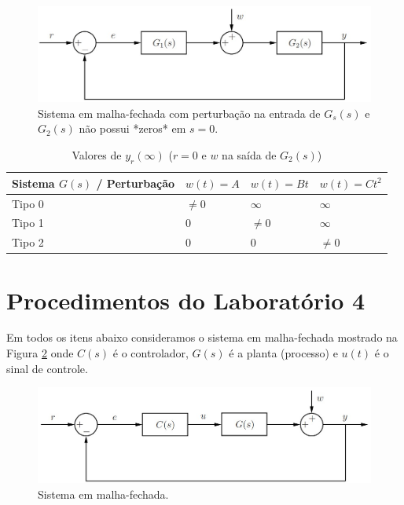 \documentclass[
]{book}
\begin{document}
\begin{figure}
\includegraphics[width=0.8\linewidth]{Imagens/Lab4/Apresentação/fig2} \caption{Sistema em malha-fechada com perturbação na entrada de $G_s(s)$ e $G_2(s)$ não possui *zeros* em $s=0$.}\label{fig:fig42}
\end{figure}

\begin{table}

\caption{\label{tab:tab43}Valores de $y_r(\infty)$ ($r=0$ e $w$ na saída de $G_2(s)$)}
\centering
\begin{tabular}[t]{llll}
\toprule
Sistema $G(s)$ / Perturbação & $w(t)=A$ & $w(t) = Bt$ & $w(t) = Ct^2$\\
\midrule
Tipo 0 & $\neq 0$ & $\infty$ & $\infty$\\
Tipo 1 & 0 & $\neq 0$ & $\infty$\\
Tipo 2 & 0 & 0 & $\neq 0$\\
\bottomrule
\end{tabular}
\end{table}

\hypertarget{procedimentos-do-laboratuxf3rio-4}{%
\section*{Procedimentos do Laboratório 4}\label{procedimentos-do-laboratuxf3rio-4}}

Em todos os itens abaixo consideramos o sistema em malha-fechada mostrado na Figura \ref{fig:fig43} onde \(C(s)\) é o controlador, \(G(s)\) é a planta (processo) e \(u(t)\) é o sinal de controle.

\begin{figure}
\includegraphics[width=0.8\linewidth]{Imagens/Lab4/Apresentação/fig3} \caption{Sistema em malha-fechada.}\label{fig:fig43}
\end{figure}
\end{document}
